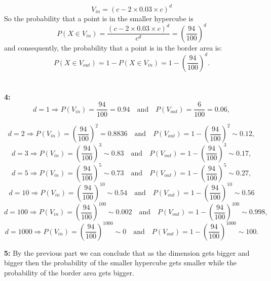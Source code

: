 \documentclass[12pt,english]{amsart}
\theoremstyle{definition}
\begin{document}
$$V_{in}=  \left(c- 2\times 0.03 \times c\right)^d$$
So the probability that a point is in the smaller hypercube is
$$P(X\in V_{in})= \frac{\left(c- 2\times 0.03 \times c\right)^d}{c^d} =\left( \frac{94}{100}\right)^d$$
and consequently, the probability that a point is in the border area is:
$$P(X\in V_{out})= 1- P(X\in V_{in})= 1-\left( \frac{94}{100}\right)^d .$$\\\\
\textbf{4:}
$$d= 1 \Rightarrow P(V_{in})= \frac{94}{100}= 0.94 \quad \text{and} \quad P(V_{out})= \frac{6}{100}=0.06,$$

$$d= 2 \Rightarrow P(V_{in})= \left(\frac{94}{100} \right)^2= 0.8836\quad \text{and} \quad P(V_{out})=1-\left(\frac{94}{100}\right)^2\sim 0.12,$$
$$d= 3 \Rightarrow P(V_{in})= \left(\frac{94}{100} \right)^3\sim 0.83\quad \text{and} \quad P(V_{out})= 1-\left(\frac{94}{100}\right)^3\sim 0.17,$$
$$d= 5 \Rightarrow P(V_{in})= \left(\frac{94}{100} \right)^5 \sim0.73\quad \text{and} \quad P(V_{out})=1-\left(\frac{94}{100}\right)^5\sim 0.27,$$
$$d= 10 \Rightarrow P(V_{in})= \left(\frac{94}{100}\right)^{10} \sim 0.54 \quad \text{and} \quad P(V_{out})= 1-\left(\frac{94}{100}\right)^{10}\sim 0.56$$
$$d= 100 \Rightarrow P(V_{in})= \left(\frac{94}{100}\right)^{100}  \sim 0.002\quad \text{and} \quad P(V_{out})=1-\left(\frac{94}{100}\right)^{100}\sim 0.998,$$
$$d= 1000\Rightarrow P(V_{in})= \left(\frac{94}{100} \right)^{1000} \sim 0\quad \text{and} \quad P(V_{out})= 1-\left(\frac{94}{100}\right)^{1000}\sim 100.$$

\textbf{5:} By the previous part we can conclude that as the dimension gets bigger and bigger then the probability of the smaller  hypercube gets smaller while the probability of the border area gets bigger. 
















\end{document}
